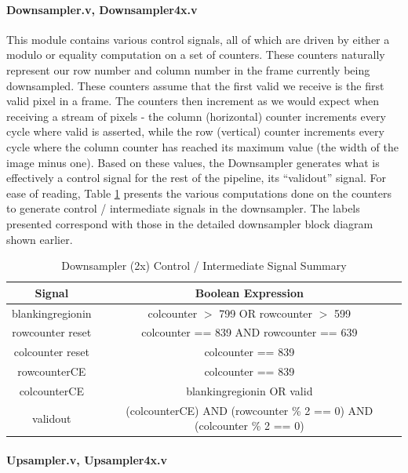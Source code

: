 \paragraph{Downsampler.v, Downsampler4x.v}
This module contains various control signals, all of which are driven by either
a modulo or equality computation on a set of counters. These counters naturally
represent our row number and column number in the frame currently being downsampled.
These counters assume that the first valid we receive is the first valid pixel in a 
frame. The counters then increment as we would expect when receiving a stream of pixels - 
the column (horizontal) counter increments every cycle where valid is asserted, 
while the row (vertical) counter increments every cycle where the column counter
has reached its maximum value (the width of the image minus one). Based on these
values, the Downsampler generates what is effectively a control signal for the
rest of the pipeline, its ``validout'' signal. For ease of reading, Table \ref{wrap-tab:downsample}
presents the various computations done on the counters to generate control / 
intermediate signals in the downsampler. The labels presented correspond with
those in the detailed downsampler block diagram shown earlier.

\begin{table}
    \tiny
\noindent \begin{tabular}{ c | c } \toprule
Signal & Boolean Expression \\\toprule
blankingregionin & colcounter $>$ 799 OR rowcounter $>$ 599 \\
rowcounter reset & colcounter == 839 AND rowcounter == 639 \\
colcounter reset & colcounter == 839 \\
rowcounterCE & colcounter == 839 \\
colcounterCE & blankingregionin OR valid \\
validout & (colcounterCE) AND (rowcounter \% 2 == 0) AND (colcounter \% 2 == 0) \\
\end{tabular}
\caption{ Downsampler (2x) Control / Intermediate Signal Summary } \label{wrap-tab:downsample}
\end{table}

\paragraph{Upsampler.v, Upsampler4x.v}

